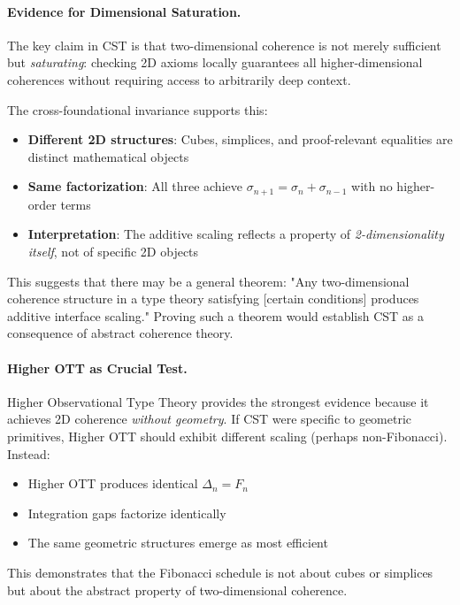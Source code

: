 \documentclass[11pt]{article}
\theoremstyle{definition}
\theoremstyle{remark}
\begin{document}
\paragraph{Evidence for Dimensional Saturation.}

The key claim in CST is that two-dimensional coherence is not merely sufficient but \emph{saturating}: checking 2D axioms locally guarantees all higher-dimensional coherences without requiring access to arbitrarily deep context.

The cross-foundational invariance supports this:
\begin{itemize}
\item \textbf{Different 2D structures}: Cubes, simplices, and proof-relevant equalities are distinct mathematical objects
\item \textbf{Same factorization}: All three achieve $\sigma_{n+1} = \sigma_n + \sigma_{n-1}$ with no higher-order terms
\item \textbf{Interpretation}: The additive scaling reflects a property of \emph{2-dimensionality itself}, not of specific 2D objects
\end{itemize}

This suggests that there may be a general theorem: "Any two-dimensional coherence structure in a type theory satisfying [certain conditions] produces additive interface scaling." Proving such a theorem would establish CST as a consequence of abstract coherence theory.

\paragraph{Higher OTT as Crucial Test.}

Higher Observational Type Theory provides the strongest evidence because it achieves 2D coherence \emph{without geometry}. If CST were specific to geometric primitives, Higher OTT should exhibit different scaling (perhaps non-Fibonacci). Instead:

\begin{itemize}
\item Higher OTT produces identical $\Delta_n = F_n$
\item Integration gaps factorize identically
\item The same geometric structures emerge as most efficient
\end{itemize}

This demonstrates that the Fibonacci schedule is not about cubes or simplices but about the abstract property of two-dimensional coherence.
\end{document}
